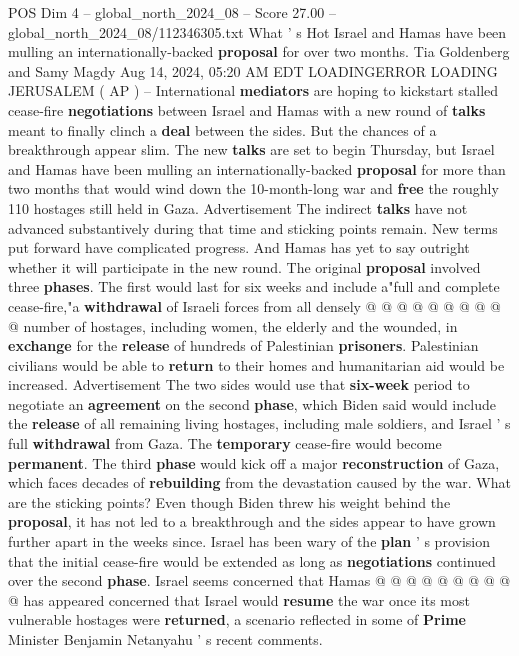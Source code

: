 \begin{textsample}{POS Dim 4 – global\_north\_2024\_08 – Score 27.00 – global\_north\_2024\_08/112346305.txt}  \label{ex:f4_pos_162}
What ' s Hot Israel and Hamas have been mulling an internationally-backed \textbf{proposal} for over two months.
Tia Goldenberg and Samy Magdy Aug 14, 2024, 05:20 AM EDT LOADINGERROR LOADING JERUSALEM ( AP ) -- International \textbf{mediators} are hoping to kickstart stalled cease-fire \textbf{negotiations} between Israel and Hamas with a new round of \textbf{talks} meant to finally clinch a \textbf{deal} between the sides.
But the chances of a breakthrough appear slim.
The new \textbf{talks} are set to begin Thursday, but Israel and Hamas have been mulling an internationally-backed \textbf{proposal} for more than two months that would wind down the 10-month-long war and \textbf{free} the roughly 110 hostages still held in Gaza.
Advertisement The indirect \textbf{talks} have not advanced substantively during that time and sticking points remain.
New terms put forward have complicated progress.
And Hamas has yet to say outright whether it will participate in the new round.
The original \textbf{proposal} involved three \textbf{phases}.
The first would last for six weeks and include a"full and complete cease-fire,"a \textbf{withdrawal} of Israeli forces from all densely @ @ @ @ @ @ @ @ @ @ number of hostages, including women, the elderly and the wounded, in \textbf{exchange} for the \textbf{release} of hundreds of Palestinian \textbf{prisoners}.
Palestinian civilians would be able to \textbf{return} to their homes and humanitarian aid would be increased.
Advertisement The two sides would use that \textbf{six-week} period to negotiate an \textbf{agreement} on the second \textbf{phase}, which Biden said would include the \textbf{release} of all remaining living hostages, including male soldiers, and Israel ' s full \textbf{withdrawal} from Gaza.
The \textbf{temporary} cease-fire would become \textbf{permanent}.
The third \textbf{phase} would kick off a major \textbf{reconstruction} of Gaza, which faces decades of \textbf{rebuilding} from the devastation caused by the war.
What are the sticking points?
Even though Biden threw his weight behind the \textbf{proposal}, it has not led to a breakthrough and the sides appear to have grown further apart in the weeks since.
Israel has been wary of the \textbf{plan} ' s provision that the initial cease-fire would be extended as long as \textbf{negotiations} continued over the second \textbf{phase}.
Israel seems concerned that Hamas @ @ @ @ @ @ @ @ @ @ has appeared concerned that Israel would \textbf{resume} the war once its most vulnerable hostages were \textbf{returned}, a scenario reflected in some of \textbf{Prime} Minister Benjamin Netanyahu ' s recent comments.

\end{textsample}
